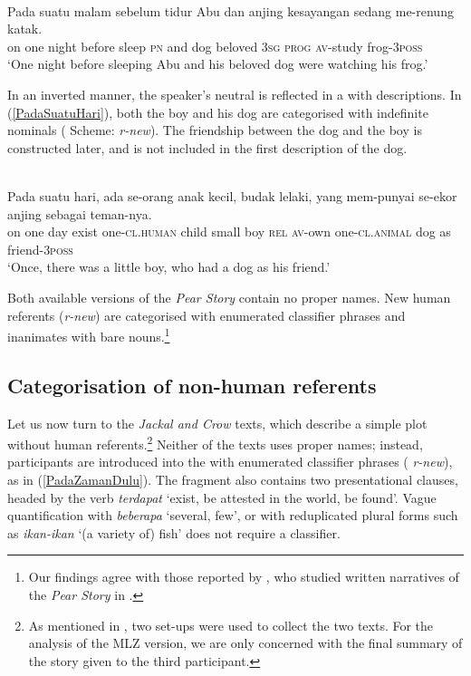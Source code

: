 \documentclass[output=paper
,modfonts
,nonflat]{langsci/langscibook}
\begin{document}
\ea\label{PadaSuatuMalam} 
\\
	\gll Pada suatu      malam sebelum tidur {\ob}Abu{\cb}      dan   {\ob}anjing kesayangan  sedang  me-renung  {\ob}katak.\\
on   one        night before  sleep \textsc{pn} and  dog    beloved    \textsc{3sg} \textsc{prog} \textsc{av-}study     frog\textsc{-3poss}\\
\glt `One night before sleeping Abu and his beloved dog were watching his frog.'
\z

\noindent
In an inverted manner, the speaker's neutral  is reflected in a  with descriptions. In (\ref{PadaSuatuHari}), both the boy and his dog are categorised  with indefinite nominals ( Scheme:  \emph{r-new}). The friendship between the dog and the boy is constructed later, and is not included in the first description of the dog.

\ea\label{PadaSuatuHari} 
\\
	\gll Pada suatu  hari, ada   {\ob}se-orang anak kecil{\cb}, {budak lelaki}, yang mem-punyai  {\ob}se-ekor anjing{\cb} sebagai teman-nya.\\
on   one    day   exist one-\textsc{cl.human}  child  small     boy    \textsc{rel}  \textsc{av-}own
one-\textsc{cl.animal}   dog    as      friend-\textsc{3poss}\\
\glt `Once, there was a little boy, who had a dog as his friend.'
\z

\noindent
Both available versions of the \emph{Pear Story} contain no proper names. New human referents (\emph{r-new}) are categorised with enumerated classifier phrases and inanimates with bare nouns.\footnote{Our findings agree with those reported by \cite{Sukamto2013}, who studied written narratives of the \emph{Pear Story} in .} 

\subsection{Categorisation of non-human referents}\label{CategorisationNonHuman}
Let us now turn to the \emph{Jackal and Crow} texts, which describe a simple plot without human referents.\footnote{As mentioned in , two set-ups were used to collect the two texts. For the analysis of the MLZ version, we are only concerned with the final summary of the story given to the third participant.} Neither of the texts uses proper names; instead, participants are introduced into the  with enumerated classifier phrases ( \emph{r-new}), as in (\ref{PadaZamanDulu}). The fragment also contains two presentational clauses, headed by the verb \emph{terdapat} `exist, be attested in the world, be found'. Vague quantification with \emph{beberapa} `several, few',  or  with reduplicated plural forms such as \emph{ikan-ikan} `(a variety of) fish' does not require a classifier. 
\end{document}
